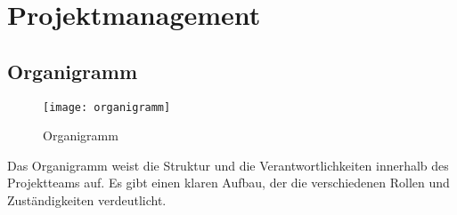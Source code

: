 \section{Projektmanagement}\label{sec:projektmanagement}

\subsection{Organigramm}\label{subsec:Organigramm}

\begin{figure}[H]
    \centering
    \texttt{[image: organigramm]}
    \caption{Organigramm}\label{fig:organigramm}
\end{figure}

Das Organigramm weist die Struktur und die Verantwortlichkeiten innerhalb des Projektteams auf.
Es gibt einen klaren Aufbau, der die verschiedenen Rollen und Zuständigkeiten verdeutlicht.


